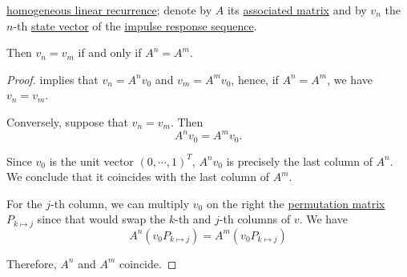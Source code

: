 \begin{lemma}\label{thm:impulse_response_sequence_cancellation}
  \hyperref[def:homogeneous_linear_recurrence]{homogeneous linear recurrence}; denote by \( A \) its \hyperref[def:homogeneous_linear_recurrence_matrix]{associated matrix} and by \( v_n \) the \( n \)-th \hyperref[def:recurrence_relation/state]{state vector} of the \hyperref[def:recurrence_relation_space]{impulse response sequence}.

  Then \( v_n = v_m \) if and only if \( A^n = A^m \).
\end{lemma}
\begin{proof}
  \NecessitySubProof {} implies that \( v_n = A^n v_0 \) and \( v_m = A^m v_0 \), hence, if \( A^n = A^m \), we have \( v_n = v_m \).

  \SufficiencySubProof Conversely, suppose that \( v_n = v_m \). Then
  \begin{equation*}
    A^n v_0 = A^m v_0.
  \end{equation*}

  Since \( v_0 \) is the unit vector \( (0, \cdots, 1)^T \), \( A^n v_0 \) is precisely the last column of \( A^n \). We conclude that it coincides with the last column of \( A^m \).

  For the \( j \)-th column, we can multiply \( v_0 \) on the right the \hyperref[def:elementary_matrix/permutation]{permutation matrix} \( P_{k \mapsto j} \) since that would swap the \( k \)-th and \( j \)-th columns of \( v \). We have
  \begin{equation*}
    A^n (v_0 P_{k \mapsto j}) = A^m (v_0 P_{k \mapsto j})
  \end{equation*}

  Therefore, \( A^n \) and \( A^m \) coincide.
\end{proof}

